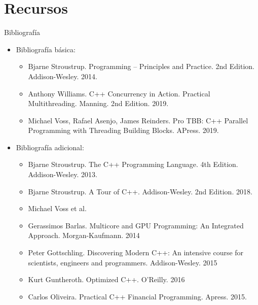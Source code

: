 \section{Recursos}

\begin{frame}[t]{Bibliografía}
\begin{itemize}
  \item Bibliografía básica:
    \begin{itemize}
      \item Bjarne Stroustrup. Programming – Principles and Practice. 2nd Edition. Addison-Wesley. 2014.
      \item Anthony Williams. C++ Concurrency in Action. Practical Multithreading. Manning. 2nd Edition. 2019.
      \item Michael Voss, Rafael Asenjo, James Reinders. Pro TBB: C++ Parallel Programming with Threading Building Blocks. APress. 2019.
    \end{itemize}
  \vspace{1em}
  \pause
  \item \footnotesize Bibliografía adicional:
    \begin{itemize}
      \item \tiny Bjarne Stroustrup. The C++ Programming Language. 4th Edition. Addison-Wesley. 2013.
      \item \tiny Bjarne Stroustrup. A Tour of C++. Addison-Wesley. 2nd Edition. 2018.
      \item \tiny Michael Voss et al. 
      \item \tiny Gerassimos Barlas. Multicore and GPU Programming: An Integrated Approach. Morgan-Kaufmann. 2014
      \item \tiny Peter Gottschling. Discovering Modern C++: An intensive course for scientists, engineers and programmers. Addison-Wesley. 2015
      \item \tiny Kurt Guntheroth. Optimized C++. O’Reilly. 2016
      \item \tiny Carlos Oliveira. Practical C++ Financial Programming. Apress. 2015.
    \end{itemize}
\end{itemize}
\end{frame}

